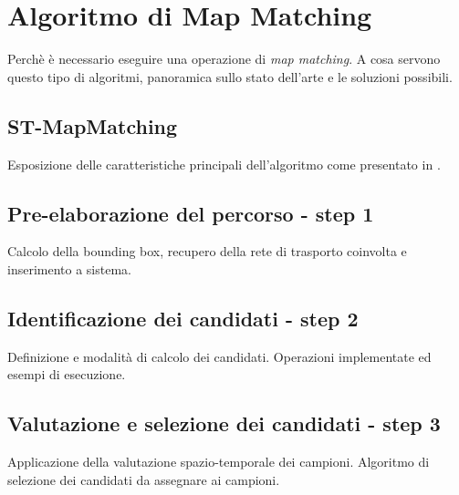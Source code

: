 \section{Algoritmo di Map Matching}
Perchè è necessario eseguire una operazione di \emph{map matching}. A cosa servono questo tipo di algoritmi, panoramica sullo stato dell'arte e le soluzioni possibili.
\subsection{ST-MapMatching}
Esposizione delle caratteristiche principali dell'algoritmo come presentato in \cite{stmapmatching}.
\subsection{Pre-elaborazione del percorso - step 1}
Calcolo della bounding box, recupero della rete di trasporto coinvolta e inserimento a sistema.
\subsection{Identificazione dei candidati - step 2}
Definizione e modalità di calcolo dei candidati. Operazioni implementate ed esempi di esecuzione.
\subsection{Valutazione e selezione dei candidati - step 3}
Applicazione della valutazione spazio-temporale dei campioni. Algoritmo di selezione dei candidati da assegnare ai campioni. 